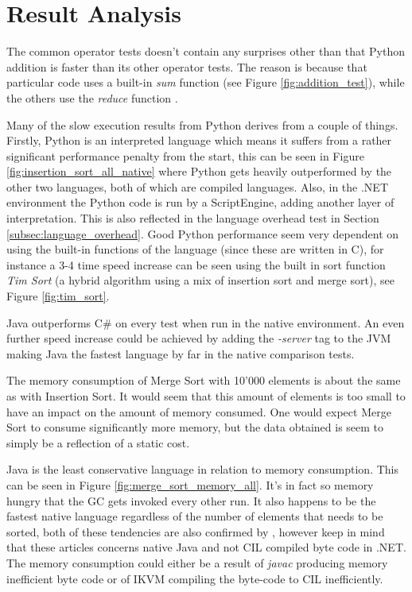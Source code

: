 \section{Result Analysis}

The common operator tests doesn't contain any surprises other than that Python addition is faster than its other operator tests. The reason is because that particular code uses a built-in \textit{sum} function \cite{PythonSum} (see Figure \ref{fig:addition_test}), while the others use the \textit{reduce} function \cite{PythonReduce}.

Many of the slow execution results from Python derives from a couple of things. Firstly, Python is an interpreted language which means it suffers from a rather significant performance penalty from the start, this can be seen in Figure \ref{fig:insertion_sort_all_native} where Python gets heavily outperformed by the other two languages, both of which are compiled languages. Also, in the .NET environment the Python code is run by a ScriptEngine, adding another layer of interpretation. This is also reflected in the language overhead test in Section \ref{subsec:language_overhead}. Good Python performance seem very dependent on using the built-in functions of the language (since these are written in C), for instance a 3-4 time speed increase can be seen using the built in sort function \textit{Tim Sort} \cite{PythonSort} (a hybrid algorithm using a mix of insertion sort and merge sort), see Figure \ref{fig:tim_sort}.

Java outperforms C\# on every test when run in the native environment. An even further speed increase could be achieved by adding the \textit{-server} tag to the JVM making Java the fastest language by far in the native comparison tests.

The memory consumption of Merge Sort with 10'000 elements is about the same as with Insertion Sort. It would seem that this amount of elements is too small to have an impact on the amount of memory consumed. One would expect Merge Sort to consume significantly more memory, but the data obtained is seem to simply be a reflection of a static cost.

Java is the least conservative language in relation to memory consumption. This can be seen in Figure \ref{fig:merge_sort_memory_all}. It's in fact so memory hungry that the GC gets invoked every other run. It also happens to be the fastest native language regardless of the number of elements that needs to be sorted, both of these tendencies are also confirmed by \cite{Benchmark} \cite{Benchmark2}, however keep in mind that these articles concerns native Java and not CIL compiled byte code in .NET. The memory consumption could either be a result of \textit{javac} producing memory inefficient byte code or of IKVM compiling the byte-code to CIL inefficiently.

